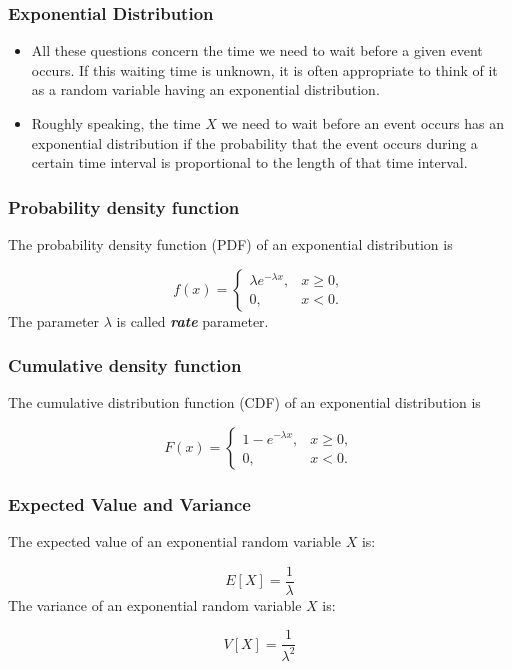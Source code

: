\documentclass[a4]{beamer}
\begin{document}
\begin{frame}[fragile]
\frametitle{Exponential Distribution}

\begin{itemize}
\item All these questions concern the time we need to wait before a given event occurs. If this waiting time is unknown, it is often appropriate to think of it as a random variable having an exponential distribution.
\item Roughly speaking, the time $X$ we need to wait before an event occurs has an exponential distribution if the probability that the event occurs during a certain time interval is proportional to the length of that time interval.

\end{itemize}
\end{frame}

\begin{frame}[fragile]
\frametitle{Probability density function}
The probability density function (PDF) of an exponential distribution is

\[
f(x) = \begin{cases}
\lambda e^{-\lambda x}, & x \ge 0, \\
0, & x < 0.
\end{cases}\]
The parameter $\lambda$  is called \textbf{\emph{rate}} parameter.
\end{frame}

\begin{frame}[fragile]
\frametitle{Cumulative density function}
The cumulative distribution function (CDF) of an exponential distribution is

\[
F(x) = \begin{cases}
1-e^{-\lambda x}, & x \ge 0, \\
0, & x < 0.
\end{cases}\]

\end{frame}

\begin{frame}[fragile]
\frametitle{Expected Value and Variance}
The expected value of an exponential random variable $X$ is:

\[
E[X] = \frac{1}{\lambda}\]
The variance of an exponential random variable $X$ is:

\[
V[X] = \frac{1}{\lambda^2}\]

\end{frame}
\end{document}
